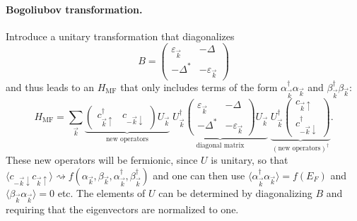 \documentclass[../../main.tex]{subfiles}
\begin{document}
\paragraph{Bogoliubov transformation.}
Introduce a unitary transformation that diagonalizes
\begin{equation*}
B = \left(\begin{matrix}\varepsilon_{\vec k}&-\Delta\\
-\Delta^*&-\varepsilon_{\vec k}\end{matrix}\right)     
\end{equation*}
and thus leads to an
$H_{\mathrm{MF}}$ that only includes terms of the form
$\alpha^\dagger_{\vec k}\alpha_{\vec k}$ and $\beta^\dagger_{\vec k}\beta_{\vec k}$:
\begin{equation}
H_{\mathrm{MF}} = \sum_{\vec k}
  \underbrace{
  \begin{pmatrix}c^\dagger_{\vec k\uparrow}&c_{-\vec k\downarrow}\end{pmatrix}
  U_{\vec k}}_{\text{new operators}}\;
  \underbrace{U^\dagger_{\vec k}
  \begin{pmatrix}
    \varepsilon_{\vec k} & -\Delta\\ -\Delta^* & -\varepsilon_{\vec k}
  \end{pmatrix}
  U_{\vec k}}_{\text{diagonal matrix}}\;
  \underbrace{U^\dagger_{\vec k}
  \begin{pmatrix}c_{\vec k\uparrow}\\c^\dagger_{-\vec k\downarrow}\end{pmatrix}
  }_{(\text{new operators})^\dagger}.
\label{eq:bogoliubov}
\end{equation}
These new operators will be fermionic, since $U$ is unitary, so that
$\langle c_{-\vec k\downarrow}c_{\vec k\uparrow}\rangle\rightsquigarrow
f(\alpha_{\vec k},\beta_{\vec k},\alpha^\dagger_{\vec k},\beta^\dagger_{\vec k})$ and one
can then use $\langle\alpha^\dagger_{\vec k}\alpha_{\vec k}\rangle=f(E_F)$ and
$\langle\beta_{\vec k}\alpha_{\vec k}\rangle=0$ etc. The elements of $U$ can be determined
by diagonalizing $B$ and requiring that the eigenvectors are normalized to one.
\end{document}
